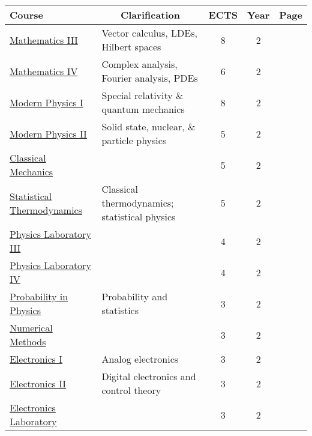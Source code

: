 \documentclass[11pt, a4paper]{article}
\begin{document}
\begin{adjustbox}{center}
\begin{tabular}{|l|l|c|c|c|}
    \textbf{Course} & \multicolumn{1}{c}{\textbf{Clarification}} & \textbf{ECTS} & \textbf{Year} & \textbf{Page}\\
    \hline
    \hline {\rule{0pt}{2.5ex}} \hspace{-7pt}
    \hyperref[mathematics_3]{Mathematics III} & Vector calculus, LDEs, Hilbert spaces & 8 & 2 & \pageref{mathematics_3} \\
    \hyperref[mathematics_4]{Mathematics IV} & Complex analysis, Fourier analysis, PDEs & 6 & 2 & \pageref{mathematics_4} \\
    \hyperref[modern_physics_1]{Modern Physics I} & Special relativity \& quantum mechanics & 8 & 2 & \pageref{modern_physics_1} \\
    \hyperref[modern_physics_2]{Modern Physics II} & Solid state, nuclear, \& particle physics & 5 & 2 & \pageref{modern_physics_2} \\
    \hyperref[classical_mechanics]{Classical Mechanics} & & 5 & 2 & \pageref{classical_mechanics} \\
    \hyperref[statistical_thermodynamics]{Statistical Thermodynamics} & Classical thermodynamics; statistical physics & 5 & 2 & \pageref{statistical_thermodynamics} \\
    \hyperref[physics_laboratory_3]{Physics Laboratory III} & & 4 & 2 & \pageref{physics_laboratory_3} \\
    \hyperref[physics_laboratory_4]{Physics Laboratory IV} & & 4 & 2 & \pageref{physics_laboratory_4} \\
    \hyperref[probability_in_physics]{Probability in Physics} & Probability and statistics & 3 & 2 & \pageref{probability_in_physics} \\
    \hyperref[numerical_methods]{Numerical Methods} & & 3 & 2 & \pageref{numerical_methods} \\
    \hyperref[electronics_1]{Electronics I} & Analog electronics & 3 & 2 & \pageref{electronics_1} \\
    \hyperref[electronics_2]{Electronics II} & Digital electronics and control theory & 3 & 2 & \pageref{electronics_2} \\
    \hyperref[electronics_laboratory]{Electronics Laboratory} & & 3 & 2 & \pageref{electronics_laboratory} \\
    \hline
    \hline


\end{tabular}
\end{adjustbox}
\end{document}
